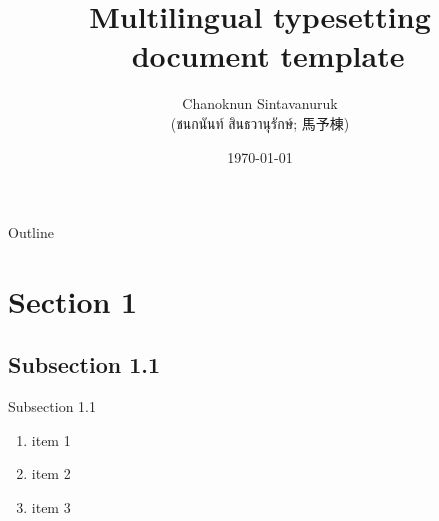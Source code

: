 \documentclass[serif]{beamer}
\title{Multilingual typesetting \XeTeX ~document template}
\author[shortname]{Chanoknun Sintavanuruk \\ (ชนกนันท์ สินธวานุรักษ์; 馬予棟) \inst{1} 
}
\institute[shortinst]{\inst{1} affiliation 
}
\date{\today}
\begin{document}
\begin{frame}
    \titlepage 
\end{frame}
\logo{}

\begin{frame}{Outline}
    \tableofcontents
\end{frame}

\section{Section 1}
\subsection{Subsection 1.1}
\begin{frame}{Subsection 1.1}
    \begin{enumerate}
        \item<1-> item 1
        \item<2-> item 2
        \item<3-> item 3
    \end{enumerate}
\end{frame}
\end{document}
